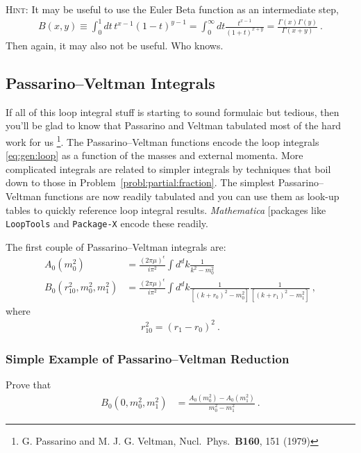 \documentclass[12pt]{article}
\numberwithin{equation}{subsection}    %
\begin{document}
\textsc{Hint}: It may be useful to use the Euler Beta function as an intermediate step,
\begin{align}
	B(x,y) \equiv \int_0^1 dt \, t^{x-1}(1-t)^{y-1}
	= \int_0^\infty dt \frac{t^{x-1}}{(1+t)^{x+y}}
	= \frac{\Gamma(x)\Gamma(y)}{\Gamma(x+y)} \ .
\end{align}
Then again, it may also not be useful. Who knows.



\subsection{Passarino--Veltman Integrals}

If all of this loop integral stuff is starting to sound formulaic but tedious, then you'll be glad to know that Passarino and Veltman tabulated most of the hard work for us
\footnote{G. Passarino and M. J. G. Veltman, Nucl.~Phys.~\textbf{B160}, 151 (1979)}. The Passarino--Veltman functions encode the loop integrals \eqref{eq:gen:loop} as a function of the masses and external momenta. More complicated integrals are related to simpler integrals by techniques that boil down to those in Problem~\ref{probl:partial:fraction}. The simplest Passarino--Veltman functions are now readily tabulated and you can use them as look-up tables to quickly reference loop integral results. \emph{Mathematica} [packages like \texttt{LoopTools} and \texttt{Package-X} encode these readily.

The first couple of Passarino--Veltman integrals are: 
\begin{align}
	A_0(m_0^2) &= \frac{(2\pi\mu)^\epsilon}{i\pi^2} \int d^dk \frac{1}{k^2 - m_0^2}
	\\
	B_0(r_{10}^2, m_0^2, m_1^2)
	&= 
	\frac{(2\pi\mu)^\epsilon}{i\pi^2} 
	\int d^dk 
	\frac{1}{\left[(k+r_0)^2 -m_0^2\right]}
	\frac{1}{\left[(k+r_1)^2 -m_1^2\right]}
	\ ,
\end{align}
where 
\begin{align}
	r_{10}^2 = (r_1-r_0)^2 \ .
\end{align}
\subsubsection{Simple Example of Passarino--Veltman Reduction}
Prove that
\begin{align}
	B_0(0,m_0^2, m_1^2)
	&= \frac{A_0(m_0^2)- A_0(m_1^2)}{m_0^2 - m_1^2} \ .
\end{align}
\end{document}
